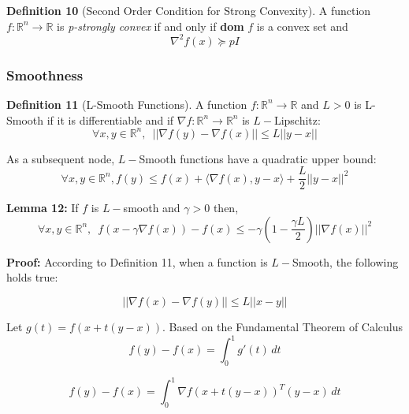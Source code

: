 \noindent \textbf{Definition 10} (Second Order Condition for Strong Convexity). A function $f: \mathbb{R}^n \rightarrow \mathbb{R}$ is \textit{p-strongly convex} if and only if \textbf{dom} $f$ is a convex set and 
\begin{equation}
    \nabla^2 f(x) \succeq pI
\end{equation}

\subsubsection{Smoothness}
\noindent \textbf{Definition 11} (L-Smooth Functions). A function $f: \mathbb{R}^n \rightarrow \mathbb{R}$ and $L > 0$ is L-Smooth if it is differentiable and if $\nabla f: \mathbb{R}^n \rightarrow \mathbb{R}^n$ is $L-$Lipschitz: 
\begin{equation}
    \forall x, y \in \mathbb{R}^n, \enspace ||\nabla f(y) - \nabla f(x)|| \leq L ||y - x||
\end{equation}

\noindent As a subsequent node, $L-$Smooth functions have a quadratic upper bound: 
\begin{equation}
    \forall x, y \in \mathbb{R}^n, f(y) \leq f(x) + \langle \nabla f(x), y - x \rangle + \frac{L}{2} ||y - x||^2
\end{equation}

\noindent \textbf{Lemma 12:} If $f$ is $L-$smooth and $\gamma > 0$ then, 
\begin{equation}
    \forall x, y \in \mathbb{R}^n, \enspace f(x - \gamma \nabla f(x)) - f(x) \leq -\gamma (1 - \frac{\gamma L}{2}) ||\nabla f(x)||^2
\end{equation}

\noindent \textbf{Proof:}  \newline 
According to Definition 11, when a function is $L-$Smooth, the following holds true: 

\begin{equation}
    ||\nabla f(x) - \nabla f(y)|| \leq L ||x - y||
\end{equation}

\noindent Let $g(t) = f(x + t(y - x))$. Based on the Fundamental Theorem of Calculus
\begin{equation}
    f(y) - f(x) = \int_{0}^{1} g'(t) \,dt
\end{equation}

\begin{equation}
    f(y) - f(x) = \int_{0}^{1} \nabla f(x + t(y - x))^T (y - x) \,dt
\end{equation}


